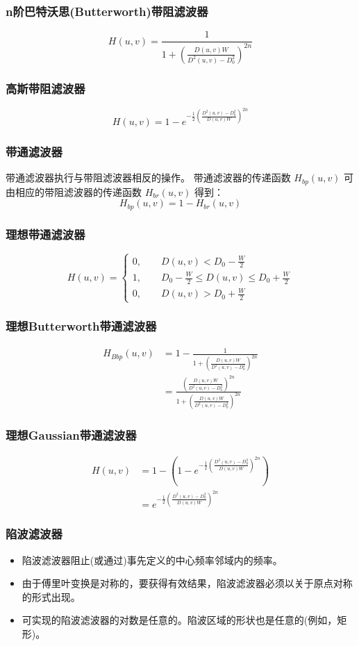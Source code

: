 \documentclass{beamer}
\begin{document}
\begin{frame}
\frametitle{n阶巴特沃思(Butterworth)带阻滤波器}
\label{sec-8-4}

\[
H(u,v) = \frac{1}{1+\left(\frac{D(u,v)W}{D^2(u,v)-D_0^2}\right)^{2n}}
\]
\end{frame}
\begin{frame}
\frametitle{高斯带阻滤波器}
\label{sec-8-5}

\[
H(u,v)=1-e^{-\frac{1}{2}\left(\frac{D^2(u,v)-D_0^2}{D(u,v)W}\right)^{2n}}
\]
\end{frame}
\begin{frame}
\frametitle{带通滤波器}
\label{sec-8-6}

带通滤波器执行与带阻滤波器相反的操作。
带通滤波器的传递函数 $H_{bp}(u,v)$ 可由相应的带阻滤波器的传递函数 $H_{br}(u,v)$ 得到：
\[ H_{bp}(u,v)=1-H_{br}(u,v) \]
\end{frame}
\begin{frame}
\frametitle{理想带通滤波器}
\label{sec-8-7}

\[ H(u,v)=
\begin{cases}
0, \qquad D(u,v)<D_0-\frac{W}{2} \\
1, \qquad D_0-\frac{W}{2} \leq D(u,v) \leq D_0+\frac{W}{2}\\
0, \qquad D(u,v)>D_0+\frac{W}{2}
\end{cases}
\]
\end{frame}
\begin{frame}
\frametitle{理想Butterworth带通滤波器}
\label{sec-8-8}

\begin{align*}
H_{Bbp}(u,v) &=1- \frac{1}{1+\left(\frac{D(u,v)W}{D^2(u,v)-D_0^2}\right)^{2n}}\\
&= \frac{\left(\frac{D(u,v)W}{D^2(u,v)-D_0^2}\right)^{2n}}{1+\left(\frac{D(u,v)W}{D^2(u,v)-D_0^2}\right)^{2n}}
\end{align*}
\end{frame}
\begin{frame}
\frametitle{理想Gaussian带通滤波器}
\label{sec-8-9}

\begin{align*}
H(u,v)&=1-\left(1-e^{-\frac{1}{2}\left(\frac{D^2(u,v)-D_0^2}{D(u,v)W}\right)^{2n}}\right)\\
&=e^{-\frac{1}{2}\left(\frac{D^2(u,v)-D_0^2}{D(u,v)W}\right)^{2n}}
\end{align*}
\end{frame}
\begin{frame}
\frametitle{陷波滤波器}
\label{sec-8-10}

\begin{itemize}
\item 陷波滤波器阻止(或通过)事先定义的中心频率邻域内的频率。
\item 由于傅里叶变换是对称的，要获得有效结果，陷波滤波器必须以关于原点对称的形式出现。
\item 可实现的陷波滤波器的对数是任意的。陷波区域的形状也是任意的(例如，矩形)。
\end{itemize}
\end{frame}
\end{document}
